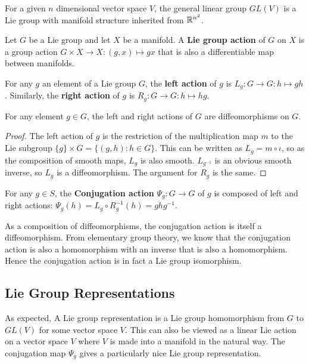 \documentclass[a4paper]{article}
\begin{document}
For a given $n$ dimensional vector space $V$, the general linear group $GL(V)$ is a Lie group with manifold structure inherited from $\mathbb{R}^{n^2}$.

\begin{defi}
    Let $G$ be a Lie group and let $X$ be a manifold. A \textbf{Lie group action} of $G$ on $X$ is a group action $G \times X \to X : (g, x) \mapsto gx$ that is also a differentiable map between manifolds. 
\end{defi}

\begin{defi}
    For any $g$ an element of a Lie group $G$, the \textbf{left action} of $g$ is $L_g : G \to G: h \mapsto gh$. Similarly, the \textbf{right action} of $g$ is $R_g : G \to G: h \mapsto hg$.
\end{defi}

\begin{thm}
    For any element $g\in G$, the left and right actions of $G$ are diffeomorphisms on $G$. 
\end{thm}

\begin{proof}
The left action of $g$ is the restriction of the multiplication map $m$ to the Lie subgroup $\{g\} \times G = \{(g, h) : h \in G\}$. This can be written as $L_g = m \circ \iota$, so as the composition of smooth maps, $L_g$ is also smooth. $L_{g^{-1}}$ is an obvious smooth inverse, so $L_g$ is a diffeomorphism. The argument for $R_g$ is the same.
\end{proof}

\begin{defi}
    For any $g \in S$, the \textbf{Conjugation action} $\Psi_g : G \to G$ of $g$ is composed of left and right actions: $\Psi_g(h) = L_g \circ R_g^{-1}(h) = ghg^{-1}$. 
\end{defi}

As a composition of diffeomorphisms, the conjugation action is itself a diffeomorphism. From elementary group theory, we know that the conjugation action is also a homomorphism with an inverse that is also a homomorphism. Hence the conjugation action is in fact a Lie group isomorphism.

\subsection{Lie Group Representations}
As expected, A Lie group representation is a Lie group homomorphism from $G$ to $GL(V)$ for some vector space $V$. This can also be viewed as a linear Lie action on a vector space $V$ where $V$ is made into a manifold in the natural way. The conjugation map $\Psi_g$ gives a particularly nice Lie group representation.
\end{document}
